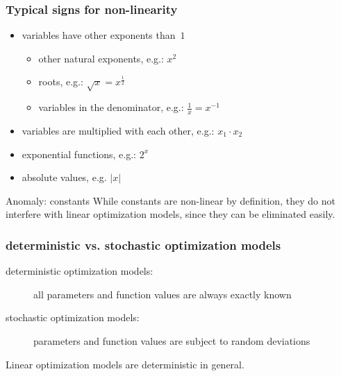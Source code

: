 \begin{frame}
 \frametitle{Typical signs for non-linearity}
 \begin{itemize}
  \item variables have other exponents than~$1$
  \begin{itemize}
   \item other natural exponents, e.g.: $x^2$
   \item roots, e.g.: $\sqrt{x} = x^{\frac{1}{2}}$
   \item variables in the denominator, e.g.: $\frac{1}{x} = x^{-1}$
  \end{itemize}
  \item variables are multiplied with each other, e.g.: $x_1\cdot x_2$
  \item exponential functions, e.g.: $2^x$
  \item absolute values, e.g. $|x|$
 \end{itemize}

 \begin{block}{Anomaly: constants}
  While constants are non-linear by definition, they do not interfere with linear optimization models, since they can be eliminated easily.
 \end{block}
\end{frame}

\begin{frame}
 \frametitle{deterministic vs. stochastic optimization models}
 \begin{description}
  \item[deterministic optimization models:] all parameters and function values are always exactly known
  \item[stochastic optimization models:] parameters and function values are subject to random deviations
 \end{description}
 
 Linear optimization models are deterministic in general.
\end{frame}

